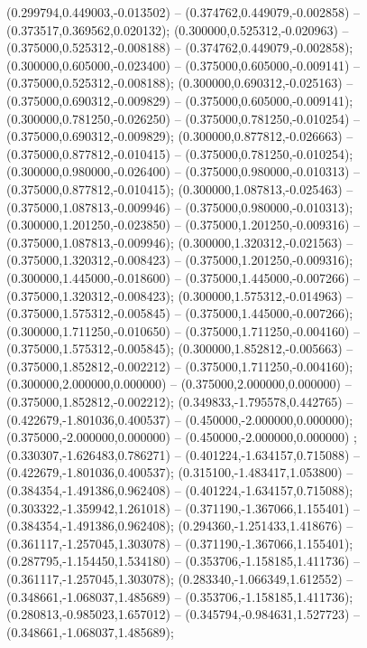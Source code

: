  (0.299794,0.449003,-0.013502) -- (0.374762,0.449079,-0.002858) -- (0.373517,0.369562,0.020132);
 (0.300000,0.525312,-0.020963) -- (0.375000,0.525312,-0.008188) -- (0.374762,0.449079,-0.002858);
 (0.300000,0.605000,-0.023400) -- (0.375000,0.605000,-0.009141) -- (0.375000,0.525312,-0.008188);
 (0.300000,0.690312,-0.025163) -- (0.375000,0.690312,-0.009829) -- (0.375000,0.605000,-0.009141);
 (0.300000,0.781250,-0.026250) -- (0.375000,0.781250,-0.010254) -- (0.375000,0.690312,-0.009829);
 (0.300000,0.877812,-0.026663) -- (0.375000,0.877812,-0.010415) -- (0.375000,0.781250,-0.010254);
 (0.300000,0.980000,-0.026400) -- (0.375000,0.980000,-0.010313) -- (0.375000,0.877812,-0.010415);
 (0.300000,1.087813,-0.025463) -- (0.375000,1.087813,-0.009946) -- (0.375000,0.980000,-0.010313);
 (0.300000,1.201250,-0.023850) -- (0.375000,1.201250,-0.009316) -- (0.375000,1.087813,-0.009946);
 (0.300000,1.320312,-0.021563) -- (0.375000,1.320312,-0.008423) -- (0.375000,1.201250,-0.009316);
 (0.300000,1.445000,-0.018600) -- (0.375000,1.445000,-0.007266) -- (0.375000,1.320312,-0.008423);
 (0.300000,1.575312,-0.014963) -- (0.375000,1.575312,-0.005845) -- (0.375000,1.445000,-0.007266);
 (0.300000,1.711250,-0.010650) -- (0.375000,1.711250,-0.004160) -- (0.375000,1.575312,-0.005845);
 (0.300000,1.852812,-0.005663) -- (0.375000,1.852812,-0.002212) -- (0.375000,1.711250,-0.004160);
 (0.300000,2.000000,0.000000) -- (0.375000,2.000000,0.000000) -- (0.375000,1.852812,-0.002212);
 (0.349833,-1.795578,0.442765) -- (0.422679,-1.801036,0.400537) -- (0.450000,-2.000000,0.000000);
 (0.375000,-2.000000,0.000000) -- (0.450000,-2.000000,0.000000) ;
 (0.330307,-1.626483,0.786271) -- (0.401224,-1.634157,0.715088) -- (0.422679,-1.801036,0.400537);
 (0.315100,-1.483417,1.053800) -- (0.384354,-1.491386,0.962408) -- (0.401224,-1.634157,0.715088);
 (0.303322,-1.359942,1.261018) -- (0.371190,-1.367066,1.155401) -- (0.384354,-1.491386,0.962408);
 (0.294360,-1.251433,1.418676) -- (0.361117,-1.257045,1.303078) -- (0.371190,-1.367066,1.155401);
 (0.287795,-1.154450,1.534180) -- (0.353706,-1.158185,1.411736) -- (0.361117,-1.257045,1.303078);
 (0.283340,-1.066349,1.612552) -- (0.348661,-1.068037,1.485689) -- (0.353706,-1.158185,1.411736);
 (0.280813,-0.985023,1.657012) -- (0.345794,-0.984631,1.527723) -- (0.348661,-1.068037,1.485689);
